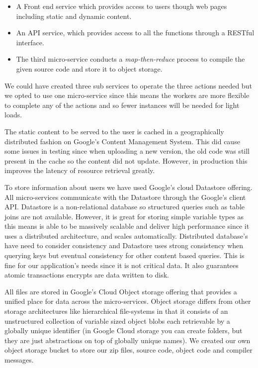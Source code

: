 \documentclass[conference]{IEEEtran}
\begin{document}
\begin{itemize}
\item A Front end service which provides access to users though web
pages including static and dynamic content.

\item An API service, which provides
access to all the functions through a RESTful interface.

\item The third micro-service conducts a \emph{map-then-reduce} process to
compile the given source code and store it to object storage. 
\end{itemize}

We could have created three
sub services to operate the three actions needed but we opted to use one micro-service since this means the workers are more flexible to complete any of the actions and so fewer instances will be needed for light loads.

The static content to be served to the user is cached in a geographically distributed fashion on Google's Content Management System. This did cause some issues in testing since when uploading a new version, the old code was still present in the cache so the content did not update. However, in production this improves the latency of resource retrieval greatly.

To store information about users we have used Google's cloud Datastore offering. All micro-services communicate with the Datastore through the Google's client API. Datastore is a non-relational database so structured queries such as table joins are not available. However, it is great for storing simple variable types as this means is able to be massively scalable and deliver high performance since it uses a distributed architecture, and scales automatically. Distributed database's have need to consider consistency and Datastore uses strong consistency when querying keys but eventual consistency for other content based queries. This is fine for our application's needs since it is not critical data. It also guarantees atomic transactions encrypts are data written to disk.

All files are stored in Google's Cloud Object storage offering that provides a unified place for data across the micro-services. Object storage differs from other storage architectures like hierarchical file-systems in that it consists of an unstructured collection of variable sized object blobs each retrievable by a globally unique identifier (in Google Cloud storage you can create folders, but they are just abstractions on top of globally unique names). We created our own object storage bucket to store our zip files, source code, object code and compiler messages. 
\end{document}
